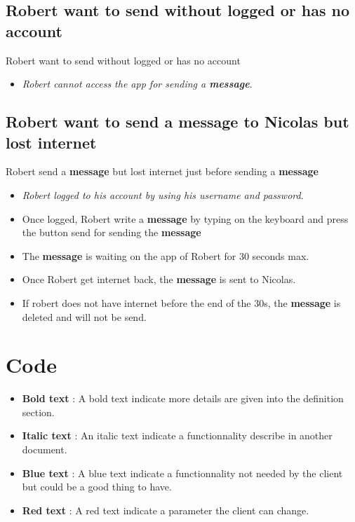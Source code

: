 \documentclass[11pt]{article}
\begin{document}
\subsection{Robert want to send without logged or has no account}

Robert want to send without logged or has no account

\begin{itemize}
  \item \emph{Robert cannot access the app for sending a \textbf{message}}.
\end{itemize}

\subsection{Robert want to send a \textbf{message} to Nicolas but lost internet}

Robert send a \textbf{message} but lost internet just before sending a \textbf{message}

\begin{itemize}
  \item \emph{Robert logged to his account by using his username and password}.
  \item Once logged, Robert write a \textbf{message} by typing on the keyboard and press the button send for sending the \textbf{message}
  \item The \textbf{message} is waiting on the app of Robert for \color{red}30 seconds max.\color{black}
  \item Once Robert get internet back, the \textbf{message} is sent to Nicolas.
  \item If robert does not have internet before the end of the 30s, the \textbf{message} is deleted and will not be send.
\end{itemize}

\section{Code}

\begin{itemize}
  \item \textbf{Bold text} : A bold text indicate more details are given into the definition section.
  \item \textbf{Italic text} : An italic text indicate a functionnality describe in another document.
  \item \textbf{Blue text} : A blue text indicate a functionnality not needed by the client but could be a good thing to have.
  \item \textbf{Red text} : A red text indicate a parameter the client can change.
\end{itemize}
\end{document}
